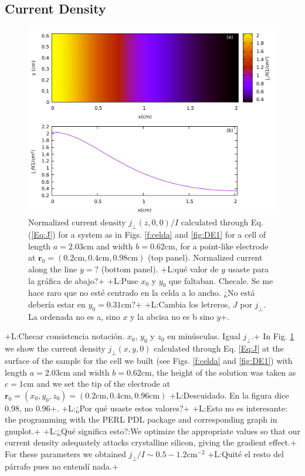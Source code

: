 \documentclass{article}
\newcommand{\notaL}[1]{{\color{blue}+L:#1+}}
\begin{document}
\subsection{Current Density}
\label{sec:current-density}
\begin{figure}
  \centering
  \includegraphics[width=\textwidth]{Images/G123}
  \caption{Normalized current density $j_\perp(z,0,0)/I$ calculated through
    Eq. (\ref{Eq:J}) for a
    system as in Figs. \ref{f:celda} and \ref{fig:DE1} for a cell of
    length $a = 2.03\text{cm}$ and width $b=0.62\text{cm}$, for a
    point-like electrode at $\bm r_0=(0.2\text{cm},
    0.4\text{cm},0.98\text{cm})$ (top panel). Normalized current
    along the line $y=?$ (bottom panel). \notaL{qué valor de $y$ usaste para la
      gráfica de abajo?} \notaL{Puse $x_0$
      y $y_0$ que faltaban. Checale. Se me hace raro que no esté
      centrado en la celda a lo ancho. ¿No está debería estar en
      $y_0=0.31\text{cm}?$} \notaL{Cambia los letreros, $J$ por
      $j_\perp$. La ordenada no es a, sino $x$ y la abcisa no es b
      sino $y$}. }
  \label{fig:DR1}
\end{figure}
\notaL{Checar consistencia notación. $x_0$, $y_0$ y $z_0$ en
  minúsculas. Igual $j_\perp$.}
In Fig. \ref{fig:DR1} we show the current density $j_\perp(x,y,0)$ calculated through
Eq. \eqref{Eq:J} at the surface of the sample for the cell we built
(see Figs. \ref{f:celda} and \ref{fig:DE1}) with length
$a=2.03\text{cm}$ and width $b = 0.62\text{cm}$, the height of the
solution was taken as $c=1\text{cm}$ and we set the tip of the
electrode at $\bm
r_0=(x_0,y_0,z_0)=(0.2\text{cm},0.4\text{cm},0.96\text{cm})$
\notaL{Descuidado. En la figura dice 0.98, no 0.96}.
\notaL{¿Por qué usaste estos valores?}
\notaL{Esto no es interesante: the programming with the
  PERL PDL package and corresponding graph in gnuplot.}
\notaL{¿Qué significa esto?:We optimize the
appropriate values so that our current density adequately attacks
crystalline silicon, giving the gradient effect.}
For these parameters we obtained $ j_\perp/I\sim
0.5-1.2\text{cm}^{-2}$
\notaL{Quité el resto del párrafo pues no entendí nada.}
\end{document}
